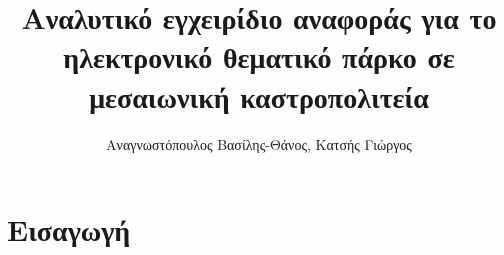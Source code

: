 \documentclass[a4paper,titlepage,twoside,12pt,leqno]{article}
\title{Αναλυτικό εγχειρίδιο αναφοράς για το ηλεκτρονικό θεματικό πάρκο σε μεσαιωνική καστροπολιτεία}
\author{Αναγνωστόπουλος Βασίλης-Θάνος, Κατσής Γιώργος}
\date{}
\begin{document}
\maketitle


\section{Εισαγωγή}
\end{document}
